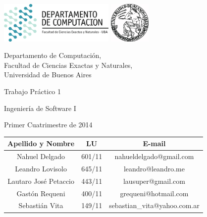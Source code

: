 \documentclass[a4paper, 10pt, twoside]{article}
\begin{document}


\thispagestyle{caratula}

\begin{center}

\includegraphics[height=2cm]{DC.png} 
\hfill
\includegraphics[height=2cm]{UBA.jpg} 

\vspace{2cm}

Departamento de Computación,\\
Facultad de Ciencias Exactas y Naturales,\\
Universidad de Buenos Aires

\vspace{4cm}

\begin{Huge}
Trabajo Práctico 1
\end{Huge}

\vspace{0.5cm}

\begin{Large}
Ingeniería de Software I
\end{Large}

\vspace{1cm}

Primer Cuatrimestre de 2014

\vspace{4cm}

\begin{tabular}{|c|c|c|}
\hline
Apellido y Nombre & LU & E-mail\\
\hline
Nahuel Delgado        & 601/11 & nahueldelgado@gmail.com\\
Leandro Lovisolo      & 645/11 & leandro@leandro.me\\
Lautaro José Petaccio & 443/11 & lausuper@gmail.com\\
Gastón Requeni        & 400/11 & grequeni@hotmail.com\\
Sebastián Vita        & 149/11 & sebastian\_vita@yahoo.com.ar\\
\hline
\end{tabular}

\end{center}
\end{document}
